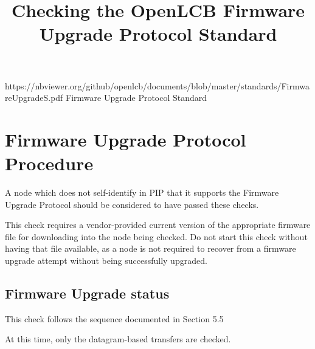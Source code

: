 

\title{Checking the OpenLCB Firmware Upgrade Protocol Standard}


\maketitle


\introductionCaveats
    {https://nbviewer.org/github/openlcb/documents/blob/master/standards/FirmwareUpgradeS.pdf}
    {Firmware Upgrade Protocol Standard}

\section{Firmware Upgrade Protocol Procedure}


A node which does not self-identify in PIP that it supports
the Firmware Upgrade Protocol should be considered to have passed these checks.
\pipsetFootnote

This check requires a vendor-provided current version of the 
appropriate firmware file for downloading into the node being checked.
Do not start this check without having that file available,
as a node is not required to recover from a firmware upgrade attempt without
being successfully upgraded.

\subsection{Firmware Upgrade status}

This check follows the sequence documented in Section 5.5

At this time, only the datagram-based transfers are checked.

